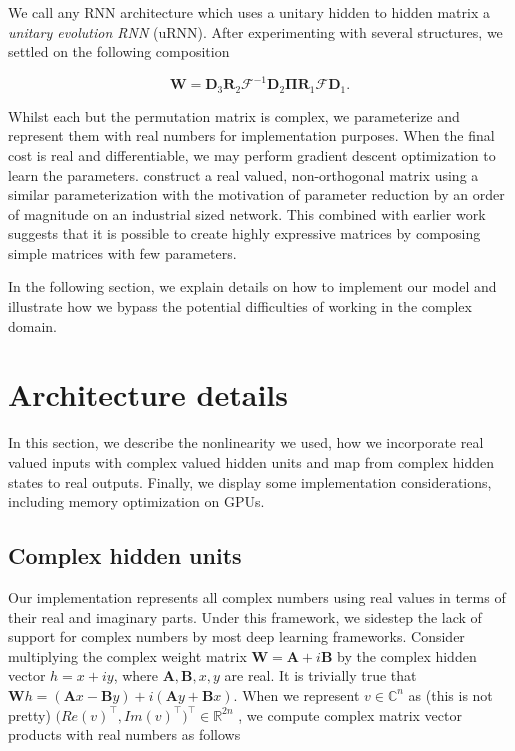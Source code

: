 \documentclass{article} %
\newcommand{\matr}[1]{\mathbf{#1}}
\newcommand\RR{\mathbb{R}}
\newcommand\CC{\mathbb{C}}
\begin{document}
We call any RNN architecture which uses a unitary hidden to hidden matrix a \textit{unitary evolution RNN}
(uRNN). After experimenting with several structures, we settled on the following composition

\begin{equation} \matr{W} = \matr{D}_3 \matr{R}_2 \mathcal{F}^{-1} \matr{D}_2 \matr{\Pi} \matr{R}_1 \mathcal{F} \matr{D}_1 .\end{equation}

Whilst each but the permutation matrix is complex, we parameterize and represent them with real numbers
for implementation purposes. When the final cost is real and differentiable, we may perform gradient descent 
optimization to learn the parameters.
\cite{dfc} construct a real valued, non-orthogonal matrix using a similar parameterization with the motivation
of parameter reduction by an order of magnitude on an industrial sized network. This combined with earlier
work \cite{fastfood} suggests that it is possible to create highly expressive matrices by composing simple
matrices with few parameters.

In the following section, we explain details on how to implement our model and illustrate how we bypass the
potential difficulties of working in the complex domain.

\section{Architecture details}

In this section, we describe the nonlinearity we used, how we incorporate real valued inputs 
with complex valued hidden units and map from complex hidden states to real outputs. 
{\color{red}Finally, we display some implementation considerations, including memory optimization on GPUs}.

\subsection{Complex hidden units}

Our implementation represents all complex numbers using real values in terms of their
real and imaginary parts. Under this framework, we sidestep the lack of support for complex numbers 
by most deep learning frameworks. Consider multiplying the complex weight matrix 
$\matr{W} = \matr{A} + i \matr{B}$ by the complex hidden vector $h = x + i y$, where
$\matr{A}, \matr{B}, x, y$ are real.
It is trivially true that $\matr{W}h = (\matr{A}x - \matr{B}y) + i (\matr{A}y + \matr{B}x)$.
When we represent $v \in \CC^n$ as {\color{red} (this is not pretty)} $\big(Re(v)^\top, Im(v)^\top \big)^\top \in \RR^{2n}$ , we
compute complex matrix vector products with real numbers as follows
\end{document}
